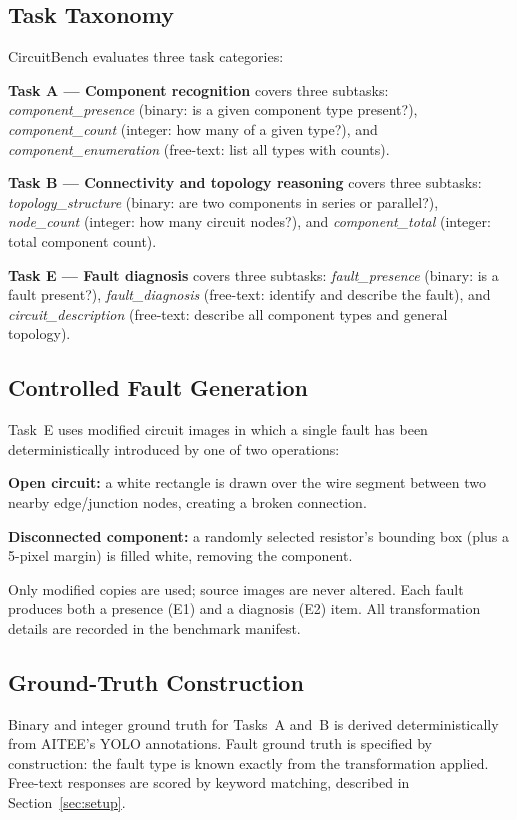 \documentclass[conference]{IEEEtran}
\begin{document}
\subsection{Task Taxonomy}

CircuitBench evaluates three task categories:

\textbf{Task A --- Component recognition} covers three subtasks:
\emph{component\_presence} (binary: is a given component type present?),
\emph{component\_count} (integer: how many of a given type?), and
\emph{component\_enumeration} (free-text: list all types with counts).

\textbf{Task B --- Connectivity and topology reasoning} covers three
subtasks: \emph{topology\_structure} (binary: are two components in
series or parallel?), \emph{node\_count} (integer: how many circuit
nodes?), and \emph{component\_total} (integer: total component count).

\textbf{Task E --- Fault diagnosis} covers three subtasks:
\emph{fault\_presence} (binary: is a fault present?),
\emph{fault\_diagnosis} (free-text: identify and describe the fault),
and \emph{circuit\_description} (free-text: describe all component types
and general topology).

\subsection{Controlled Fault Generation}

Task~E uses modified circuit images in which a single fault has been
deterministically introduced by one of two operations:

\textbf{Open circuit:} a white rectangle is drawn over the wire segment
between two nearby edge/junction nodes, creating a broken connection.

\textbf{Disconnected component:} a randomly selected resistor's bounding
box (plus a 5-pixel margin) is filled white, removing the component.

Only modified copies are used; source images are never altered.
Each fault produces both a presence (E1) and a diagnosis (E2) item.
All transformation details are recorded in the benchmark manifest.

\subsection{Ground-Truth Construction}

Binary and integer ground truth for Tasks~A and~B is derived
deterministically from AITEE's YOLO annotations.
Fault ground truth is specified by construction: the fault type is known
exactly from the transformation applied.
Free-text responses are scored by keyword matching, described in
Section~\ref{sec:setup}.
\end{document}
